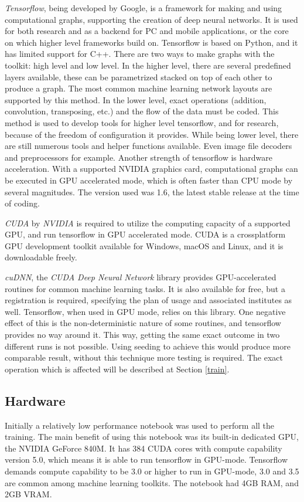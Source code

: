 \documentclass[12pt]{report}
\begin{document}
\textit{Tensorflow}, being developed by Google, is a framework for making and using computational graphs, supporting the creation of deep neural networks. It is used for both research and as a backend for PC and mobile applications, or the core on which higher level frameworks build on. Tensorflow is based on Python, and it has limited support for C++. There are two ways to make graphs with the toolkit: high level and low level. In the higher level, there are several predefined layers available, these can be parametrized stacked on top of each other to produce a graph. The most common machine learning network layouts are supported by this method. In the lower level, exact operations (addition, convolution, transposing, etc.) and the flow of the data must be coded. This method is used to develop tools for higher level tensorflow, and for research, because of the freedom of configuration it provides. While being lower level, there are still numerous tools and helper functions available. Even image file decoders and preprocessors for example. Another strength of tensorflow is hardware acceleration. With a supported NVIDIA graphics card, computational graphs can be executed in GPU accelerated mode, which is often faster than CPU mode by several magnitudes. The version used was 1.6, the latest stable release at the time of coding.

\textit{CUDA} by \textit{NVIDIA} is required to utilize the computing capacity of a supported GPU, and run tensorflow in GPU accelerated mode. CUDA is a crossplatform GPU development toolkit available for Windows, macOS and Linux, and it is downloadable freely.

\label{cudnn}
\textit{cuDNN}, the \textit{CUDA Deep Neural Network} library provides GPU-accelerated routines for common machine learning tasks. It is also available for free, but a registration is required, specifying the plan of usage and associated institutes as well. Tensorflow, when used in GPU mode, relies on this library. One negative effect of this is the non-deterministic nature of some routines, and tensorflow provides no way around it. This way, getting the same exact outcome in two different runs is not possible. Using seeding to achieve this would produce more comparable result, without this technique more testing is required. The exact operation which is affected will be described at Section \ref{train}.
\subsection{Hardware}
Initially a relatively low performance notebook was used to perform all the training. The main benefit of using this notebook was its built-in dedicated GPU, the NVIDIA GeForce 840M. It has 384 CUDA cores with compute capability version 5.0, which means it is able to run tensorflow in GPU-mode. Tensorflow demands compute capability to be 3.0 or higher to run in GPU-mode, 3.0 and 3.5 are common among machine learning toolkits. The notebook had 4GB RAM, and 2GB VRAM.
\end{document}

